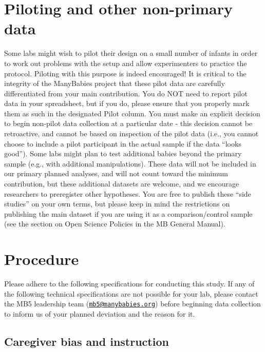 \documentclass[
]{book}
\begin{document}
\section{Piloting and other non-primary data}\label{piloting-and-other-non-primary-data}

Some labs might wish to pilot their design on a small number of infants in order to work out problems with the setup and allow experimenters to practice the protocol. Piloting with this purpose is indeed encouraged!
It is critical to the integrity of the ManyBabies project that these pilot data are carefully differentiated from your main contribution. You do NOT need to report pilot data in your spreadsheet, but if you do, please ensure that you properly mark them as such in the designated Pilot column.
You must make an explicit decision to begin non-pilot data collection at a particular date - this decision cannot be retroactive, and cannot be based on inspection of the pilot data (i.e., you cannot choose to include a pilot participant in the actual sample if the data ``looks good'').
Some labs might plan to test additional babies beyond the primary sample (e.g., with additional manipulations). These data will not be included in our primary planned analyses, and will not count toward the minimum contribution, but these additional datasets are welcome, and we encourage researchers to preregister other hypotheses. You are free to publish these ``side studies'' on your own terms, but please keep in mind the restrictions on publishing the main dataset if you are using it as a comparison/control sample (see the section on Open Science Policies in the MB General Manual).

\section{Procedure}\label{procedure}

Please adhere to the following specifications for conducting this study. If any of the following technical specifications are not possible for your lab, please contact the MB5 leadership team (\href{mailto:mb5@manybabies.org}{\nolinkurl{mb5@manybabies.org}}) before beginning data collection to inform us of your planned deviation and the reason for it.

\subsection{Caregiver bias and instruction}\label{caregiver-bias-and-instruction}
\end{document}
